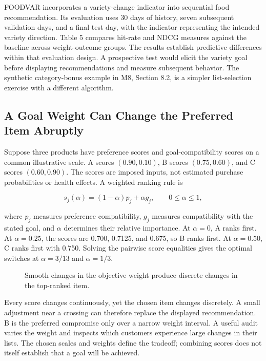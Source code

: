 FOODVAR incorporates a variety-change indicator into sequential food
recommendation. Its evaluation uses 30 days of history, seven subsequent
validation days, and a final test day, with the indicator representing
the intended variety direction. Table 5 compares hit-rate and NDCG
measures against the baseline across weight-outcome groups. The results
establish predictive differences within that evaluation design. A
prospective test would elicit the variety goal before displaying
recommendations and measure subsequent behavior. The synthetic
category-bonus example in M8, Section 8.2, is a simpler list-selection
exercise with a different algorithm.

\hypertarget{M07-a-goal-weight-can-change-the-preferred-item-abruptly}{%
\subsection{A Goal Weight Can Change the Preferred Item
Abruptly}\label{M07-a-goal-weight-can-change-the-preferred-item-abruptly}}

\noindent Suppose three products have preference scores and goal-compatibility
scores on a common illustrative scale. A scores \((0.90,0.10)\), B
scores \((0.75,0.60)\), and C scores \((0.60,0.90)\). The scores are
imposed inputs, not estimated purchase probabilities or health effects.
A weighted ranking rule is

\[
s_j(\alpha)=(1-\alpha)p_j+\alpha g_j,\qquad 0\leq\alpha\leq1,
\]

where \(p_j\) measures preference compatibility, \(g_j\) measures
compatibility with the stated goal, and \(\alpha\) determines their
relative importance. At \(\alpha=0\), A ranks first. At \(\alpha=0.25\),
the scores are 0.700, 0.7125, and 0.675, so B ranks first. At
\(\alpha=0.50\), C ranks first with 0.750. Solving the pairwise score
equalities gives the optimal switches at \(\alpha=3/13\) and
\(\alpha=1/3\).

\begin{figure}[htbp]
\centering

\caption{Smooth changes in the objective weight produce discrete changes in the top-ranked item.}\label{fig:M07_goal_blend}
\end{figure}

Every score changes continuously, yet the chosen item changes
discretely. A small adjustment near a crossing can therefore replace the
displayed recommendation. B is the preferred compromise only over a
narrow weight interval. A useful audit varies the weight and inspects
which customers experience large changes in their lists. The chosen
scales and weights define the tradeoff; combining scores does not itself
establish that a goal will be achieved.

